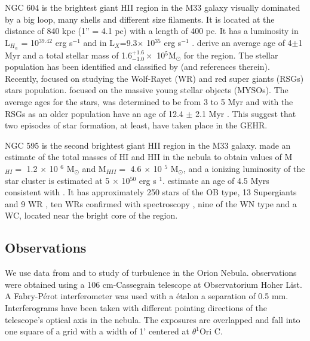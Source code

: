 \documentclass[fleqn,usenatbib, useAMS, a4paper]{mnras}
\begin{document}
NGC 604 is the brightest giant HII region in the M33 galaxy visually dominated by a big loop, many shells and different size filaments.
It is located at the distance of 840 kpc (1'' = 4.1 pc) \citep{2015KamKinematics} with a length of 400 pc.
It has a luminosity in L$_{H_\alpha}$ = 10$^{39.42}$ erg s$^{-1}$ \citep{2002MNRAS.329..481B} and in L$_{X}$=9.3$\times$ 10$^{35}$ erg s$^{-1}$ \citep{2008ApJ...685..919T}.
\citet{2012ApJ...761....3M} derive an average age of 4$\pm$1 Myr and a total stellar mass of 1.6$^{+1.6}_{-1.0} \times$ 10$^{5}$M$_{\odot}$ for the region.
The stellar population has been identified and classified by \citet{1996ApJ...456..174H} (and references therein).
Recently, \citet{2011MNRAS.411..235E} focused on studying the Wolf-Rayet (WR) and red super giants (RSGs) stars population.
\citet{2012AJ....143...43F} focused on the massive young stellar objects (MYSOs).
The average ages for the stars, was determined to be from 3 to 5 Myr \citep{1996ApJ...456..174H} and with the RSGs as an older population have an age of 12.4 $\pm$ 2.1 Myr \citep{2011MNRAS.411..235E}.
This suggest that two episodes of star formation, at least, have taken place in the GEHR.

NGC 595 is the second brightest giant HII region in the M33 galaxy.
\citet{1983A&A...119..185V} made an estimate of the total masses of HI and HII in the nebula to obtain values of M$_{HI}=$ 1.2 $\times$ 10 $^{6}$ M$_{\odot}$ and M$_{HII} =$ 4.6 $\times$ 10 $^{5}$ M$_{\odot}$, and a ionizing luminosity of the star cluster is estimated at 5 $\times$ 10$^{50}$ erg s $^{1}$.
\citet{1996AJ....111.1128M} estimate an age of 4.5 Myrs consistent with \citet{1993AJ....105.1400D}.
It has approximately 250 stars of the OB type, 13 Supergiants and 9 WR \citep{1996AJ....111.1128M}, ten WRs confirmed with spectroscopy \citet{1993AJ....105.1400D}, nine of the WN type and a WC, located near the bright core of the region.

\subsection{Observations}

We use data from \citet{1987A&A...176..347H} and \citet{arthur2016turbulence} to study of turbulence in the Orion Nebula.
\cite{1987A&A...176..347H} observations were obtained using a 106 cm-Cassegrain telescope at Observatorium Hoher List. 
A Fabry-Pérot interferometer was used with a étalon a separation of 0.5 mm. 
Interferograms have been taken with different pointing directions of the telescope's optical axis in the nebula. 
The exposures are overlapped and fall into one square of a grid with a width of 1' centered at \(\theta^{1}\)Ori C.
\end{document}
